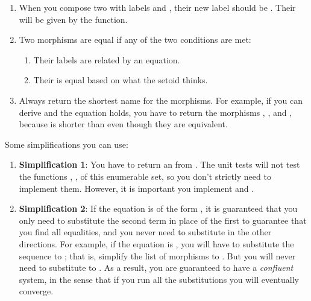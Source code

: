 \begin{enumerate}
    \item When you compose two  with labels  and , their new label should be .
          Their  will be given by the  function.
    \item Two morphisms are equal if any of the two conditions are met:
          \begin{enumerate}
              \item Their labels are related by an equation.
              \item Their  is equal based on what the setoid  thinks.
          \end{enumerate}
    \item Always return the shortest name for the morphisms.
          For example, if you can derive  and the equation  holds, you have to return the morphisms , , and , because  is shorter than  even though they are equivalent.
\end{enumerate}

Some simplifications you can use:

\begin{enumerate}
    \item  \textbf{Simplification 1}:
          You have to return an \EnumerableSet from .
          The unit tests will not test the functions , ,  of this enumerable set, so you don't strictly need to implement them.
          However, it is important you implement  and .
    \item \textbf{Simplification 2}:
          If the equation is of the form , it is guaranteed that you only need to substitute the second term in place of the first to guarantee that you find all equalities, and you never need to substitute in the other directions.
          For example, if the equation is , you will have to substitute the sequence \pystr{[d, e]} to \pystr{[a,b,c]}; that is, simplify the list of morphisms \pystr{[a,a,b,c,a]} to \pystr{[a,d,e,a]}.
          But you will never need to substitute \pystr{[a,b,c]} to \pystr{[d,e]}.
          As a result, you are guaranteed to have a \emph{confluent} system, in the sense that if you run all the substitutions you will eventually converge.

\end{enumerate}
